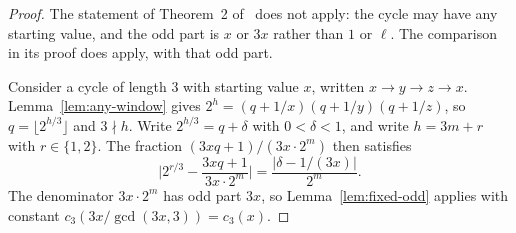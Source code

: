 \documentclass[11pt]{article}
\begin{document}
\begin{proof}
The statement of Theorem~2 of~\cite{hackman-i} does not apply: the cycle may have any starting value, and the odd part is $x$ or $3x$ rather than $1$ or $\ell$.
The comparison in its proof does apply, with that odd part.

Consider a cycle of length $3$ with starting value $x$, written $x \to y \to z \to x$.
Lemma~\ref{lem:any-window} gives $2^h = (q+1/x)(q+1/y)(q+1/z)$, so $q = \lfloor 2^{h/3} \rfloor$ and $3 \nmid h$.
Write $2^{h/3} = q + \delta$ with $0 < \delta < 1$, and write $h = 3m + r$ with $r \in \{1, 2\}$.
The fraction $(3xq+1)/(3x \cdot 2^m)$ then satisfies
\[
\Biggl| 2^{r/3} - \frac{3xq+1}{3x \cdot 2^m} \Biggr| = \frac{|\delta - 1/(3x)|}{2^m}.
\]
The denominator $3x \cdot 2^m$ has odd part $3x$, so Lemma~\ref{lem:fixed-odd} applies with constant $c_3(3x/\gcd(3x, 3)) = c_3(x)$.


\end{proof}
\end{document}
